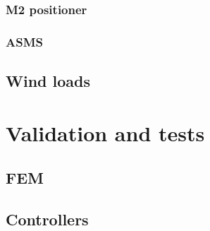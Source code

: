 \documentclass{gmto}
\begin{document}
\subsubsection{M2 positioner}
\label{sec:m2-ctrlr}

\subsubsection{ASMS}
\label{sec:asms-ctrlr}

\subsection{Wind loads}
\label{sec:wind-loads}

\appendix

\section{Validation and tests}
\label{sec:tests}

\subsection{FEM}
\label{sec:fem-tests}

\subsection{Controllers}
\label{sec:ctrlr-tests}




\printbibliography
\end{document}
